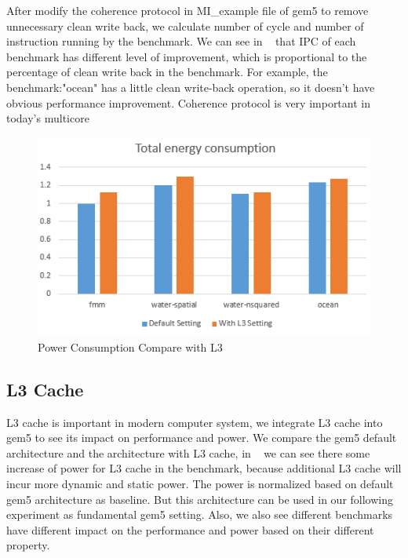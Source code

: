 After modify the coherence protocol in MI\_example file of gem5 to remove unnecessary clean write back, we calculate number of cycle and number of instruction running by the benchmark. We can see in ~ that IPC of each benchmark has different level of improvement, which is proportional to the percentage of clean write back in the benchmark. For example, the benchmark:"ocean" has a little clean write-back operation, so it doesn't have obvious performance improvement. 
Coherence protocol is very important in today's multicore 



\begin{figure}[t]
\centering
\includegraphics[width=\columnwidth]{figs/l3power} 
\caption{Power Consumption Compare with L3}
\label{fig:l3power}
\end{figure}


\subsection{L3 Cache}

L3 cache is important in modern computer system, we integrate L3 cache into gem5 to see its impact on performance and power. We compare the gem5 default architecture and the architecture with L3 cache, in ~ we can see there some increase of power for L3 cache in the benchmark, because additional L3 cache will incur more dynamic and static power. The power is normalized based on default gem5 architecture as baseline. But this architecture can be used in our following experiment as fundamental gem5 setting. Also, we also see different benchmarks have different impact on the performance and power based on their different property.       



